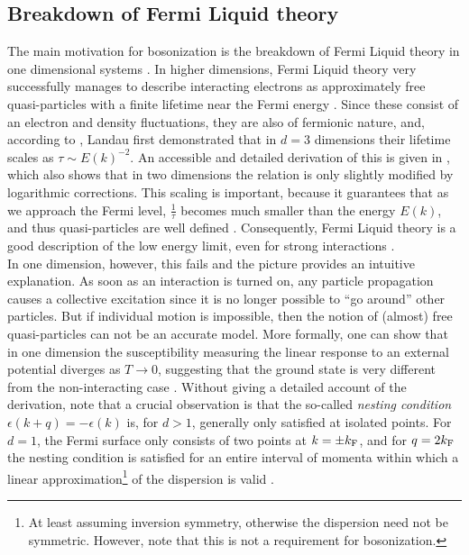 \subsection{Breakdown of Fermi Liquid theory}\label{sec:bos:introduction}
The main motivation for bosonization is the breakdown of Fermi Liquid theory in one dimensional systems \cite{Giamarchi_2004,FermiLiquid_LL_review_Voit_1995}.
In higher dimensions, Fermi Liquid theory very successfully manages to describe interacting electrons as approximately free quasi-particles with a finite lifetime near the Fermi energy \cite{QMB_Mahan_2000,FermiLiquid_review_Neilson_1996,FermiLiquid_LL_review_Voit_1995}.
Since these consist of an electron and density fluctuations, they are also of fermionic nature, and, according to \cite{FermiLiquid_review_Neilson_1996,Giamarchi_2004}, Landau first demonstrated that in $d=3$ dimensions their lifetime scales as $\tau \sim E(k)^{-2}$.
An accessible and detailed derivation of this is given in \cite{FermiLiquid_Vignale_2022}, which also shows that in two dimensions the relation is only slightly modified by logarithmic corrections.
This scaling is important, because it guarantees that as we approach the Fermi level, $\frac{1}{\tau}$ becomes much smaller than the energy $E(k)$, and thus quasi-particles are well defined \cite{Giamarchi_2004,FermiLiquid_LL_review_Voit_1995}.
Consequently, Fermi Liquid theory is a good description of the low energy limit, even for strong interactions \cites[]{Giamarchi_2004}[]{QMB_Coleman_2015}.
\\
In one dimension, however, this fails and the \trspace{} picture provides an intuitive explanation.
As soon as an interaction is turned on, any particle propagation causes a collective excitation since it is no longer possible to ``go around'' other particles.
But if individual motion is impossible, then the notion of (almost) free quasi-particles can not be an accurate model.
More formally, one can show that in one dimension the susceptibility measuring the linear response to an external potential diverges as $T\rightarrow 0$, suggesting that the ground state is very different from the non-interacting case \cite[]{Giamarchi_2004}.
Without giving a detailed account of the derivation, note that a crucial observation is that the so-called \emph{nesting condition} $\epsilon(k+q) = -\epsilon(k)$ is, for $d>1$, generally only satisfied at isolated points.
For $d=1$, the Fermi surface only consists of two points at $k=\pm k_{\text{F}}$, and for $q=2k_{\text{F}}$ the nesting condition is satisfied for an entire interval of momenta within which a linear approximation\footnote{At least assuming inversion symmetry, otherwise the dispersion need not be symmetric. However, note that this is not a requirement for bosonization.} of the dispersion is valid \cite[]{Giamarchi_2004}.\\
